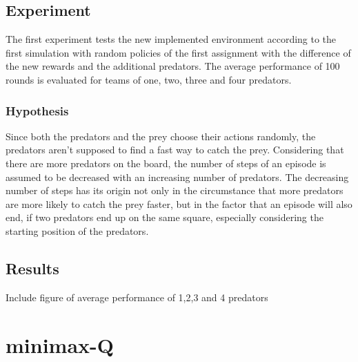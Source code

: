\documentclass[a4paper,10pt]{article}
\begin{document}
\subsection{Experiment}
The first experiment tests the new implemented environment according to the first simulation with random policies of the first assignment with the difference of the new rewards and the additional predators. The average performance of 100 rounds is evaluated for teams of one, two, three and four predators.

\subsubsection{Hypothesis}
Since both the predators and the prey choose their actions randomly, the predators aren't supposed to find a fast way to catch the prey. Considering that there are more predators on the board, the number of steps of an episode is assumed to be decreased with an increasing number of predators. The decreasing number of steps has its origin not only in the circumstance that more predators are more likely to catch the prey faster, but in the factor that an episode will also end, if two predators end up on the same square, especially considering the starting position of the predators.

\subsection{Results}
Include figure of average performance of 1,2,3 and 4 predators








\section{minimax-Q}
\end{document}
